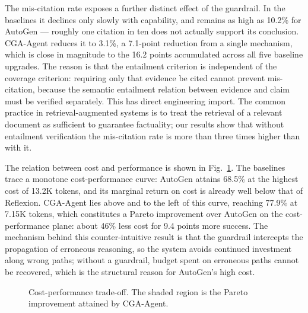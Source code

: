 \documentclass[journal,10pt,a4paper]{IEEEtran}
\begin{document}
The mis-citation rate exposes a further distinct effect of the guardrail. In the baselines it declines only slowly with capability, and remains as high as 10.2\% for AutoGen --- roughly one citation in ten does not actually support its conclusion. CGA-Agent reduces it to 3.1\%, a 7.1-point reduction from a single mechanism, which is close in magnitude to the 16.2 points accumulated across all five baseline upgrades. The reason is that the entailment criterion is independent of the coverage criterion: requiring only that evidence be cited cannot prevent mis-citation, because the semantic entailment relation between evidence and claim must be verified separately. This has direct engineering import. The common practice in retrieval-augmented systems is to treat the retrieval of a relevant document as sufficient to guarantee factuality; our results show that without entailment verification the mis-citation rate is more than three times higher than with it.

The relation between cost and performance is shown in Fig.~\ref{fig:cost}. The baselines trace a monotone cost-performance curve: AutoGen attains 68.5\% at the highest cost of 13.2K tokens, and its marginal return on cost is already well below that of Reflexion. CGA-Agent lies above and to the left of this curve, reaching 77.9\% at 7.15K tokens, which constitutes a Pareto improvement over AutoGen on the cost-performance plane: about 46\% less cost for 9.4 points more success. The mechanism behind this counter-intuitive result is that the guardrail intercepts the propagation of erroneous reasoning, so the system avoids continued investment along wrong paths; without a guardrail, budget spent on erroneous paths cannot be recovered, which is the structural reason for AutoGen's high cost.

\begin{figure}[t]
\centering
{}
\caption{Cost-performance trade-off. The shaded region is the Pareto improvement attained by CGA-Agent.}
\label{fig:cost}
\end{figure}
\end{document}
